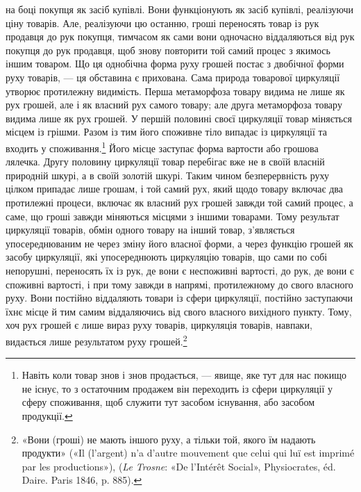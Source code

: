 \parcont{}  %
на боці покупця як засіб купівлі. Вони функціонують як засіб
купівлі, реалізуючи ціну товарів. Але, реалізуючи цю останню,
гроші переносять товар із рук продавця до рук покупця, тимчасом
як сами вони одночасно віддаляються від рук покупця до
рук продавця, щоб знову повторити той самий процес з якимось
іншим товаром. Що ця однобічна форма руху грошей постає з
двобічної форми руху товарів, — ця обставина є прихована. Сама
природа товарової циркуляції утворює протилежну видимість.
Перша метаморфоза товару видима не лише як рух грошей, але
і як власний рух самого товару; але друга метаморфоза товару
видима лише як рух грошей. У першій половині своєї циркуляції
товар міняється місцем із грішми. Разом із тим його споживне
тіло випадає із циркуляції та входить у споживання.\footnote{
Навіть коли товар знов і знов продається, — явище, яке тут для нас
покищо не існує, то з остаточним продажем він переходить із сфери циркуляції
у сферу споживання, щоб служити тут засобом існування, або
засобом продукції.
} Його
місце заступає форма вартости або грошова лялечка. Другу
половину циркуляції товар перебігає вже не в своїй власній
природній шкурі, а в своїй золотій шкурі. Таким чином безперервність
руху цілком припадає лише грошам, і той самий рух,
який щодо товару включає два протилежні процеси, включає як
власний рух грошей завжди той самий процес, а саме, що гроші
завжди міняються місцями з іншими товарами. Тому результат
циркуляції товарів, обмін одного товару на інший товар, з’являється
упосереднюваним не через зміну його власної форми, а
через функцію грошей як засобу циркуляції, які упосереднюють
циркуляцію товарів, що сами по собі непорушні, переносять їх
із рук, де вони є неспоживні вартості, до рук, де вони є споживні
вартості, і при тому завжди в напрямі, протилежному до свого
власного руху. Вони постійно віддаляють товари із сфери циркуляції,
постійно заступаючи їхнє місце й тим самим віддаляючись
від свого власного вихідного пункту. Тому, хоч рух грошей є
лише вираз руху товарів, циркуляція товарів, навпаки, видається
лише результатом руху грошей.\footnote{
«Вони (гроші) не мають іншого руху, а тільки той, якого їм надають
продукти» («Il (l’argent) n’a d’autre mouvement que celui qui luï
est imprimé par les productions»), (\emph{Le Trosne}: «De l’Intérêt Social»,
Physiocrates, éd. Daire. Paris 1846, p. 885).
}

